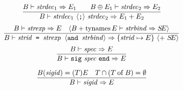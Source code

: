 \vspace{6pt}
\begin{equation}                %
\frac{ \B\ts\strdec_1\ra\E_1\qquad
       \B\oplus\E_1\ts\strdec_2\ra\E_2 }
     { \B\ts\seqstrdec\ra\plusmap{\E_1}{\E_2} }
\end{equation}
\oldpagebreak
{}
\begin{equation}                %
\label{structure-binding-rule}
\frac{
       \B\ts\strexp\ra\E\quad
       \langle\plusmap{\B}{\TyNamesFcn\E}\ts
                                      \strbind\ra\SE\rangle
     }
     { \B\ts\barestrbindera\ra\{\strid\mapsto\E\}
       \ \langle +\ \SE\rangle}\index{41.1}
\end{equation}%
%
%
\begin{equation}                %
\label{encapsulating-sigexp-rule}
\frac{\B\ts\spec\ra\E }
     {\B\ts\encsigexp\ra  \E }\index{41.2}
\end{equation}

\begin{equation}                %
\label{signature-identifier-rule}
\frac{  \B(\sigid) = (\T)\E \quad \T\cap (\of{\T}{\B}) = \emptyset}
     { \B\ts\sigid\ra\E }
\end{equation}

